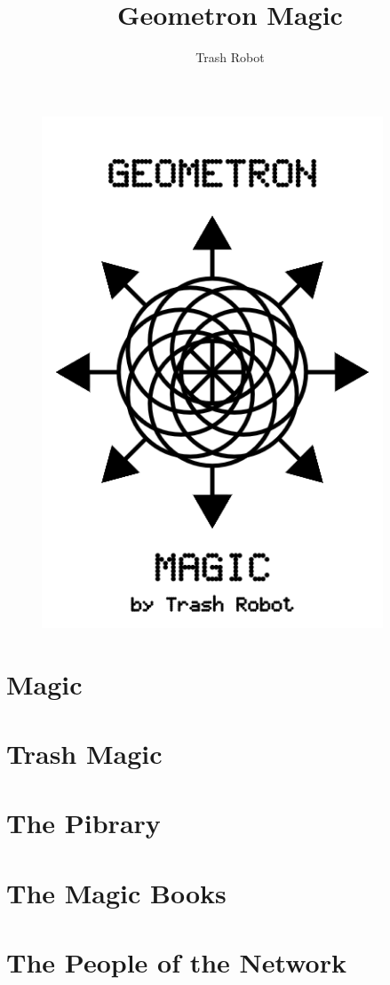 \documentclass[ebook,12pt,openany]{memoir} %
\title{Geometron Magic}
\author{Trash Robot}
\begin{document}
\frontmatter
\begin{figure}[htbp]
\centering
\includegraphics[width=4in]{cover.png}
\end{figure}

\clearpage

\clearpage

\newpage
\thispagestyle{empty}
\mbox{}

\maketitle

\tableofcontents

\listoffigures 

%

\mainmatter

\chapter{Magic}

\chapter{Trash Magic}

\chapter{The Pibrary}

\chapter{The Magic Books}

\chapter{The People of the Network}



\end{document}
